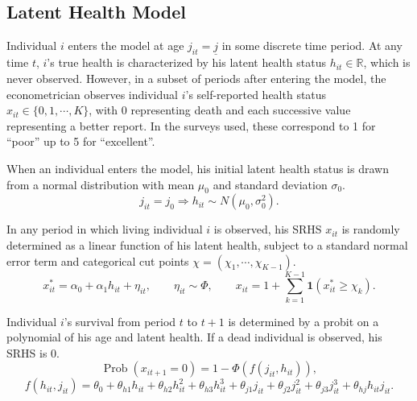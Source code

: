 \documentclass[12pt,pdftex,letterpaper]{article}
\newcommand{\Prob}{\operatorname{Prob}}
\newcommand{\R}{\mathbb{R}}
\newcommand{\Health}{h}
\newcommand{\Report}{x}
\newcommand{\Age}{j}
\newcommand{\AgeMin}{\underline{\Age}}
\newcommand{\HealthInitMean}{\mu_0}
\newcommand{\HealthInitStd}{\sigma_0}
\newcommand{\Cut}{\chi}
\newcommand{\MortParam}{\theta}
\newcommand{\LatentParam}{\alpha}
\newcommand{\ReportShock}{\eta}
\begin{document}
\subsection{Latent Health Model}\label{sec:Model}

Individual $i$ enters the model at age $\Age_{it}=\AgeMin$ in some discrete time period.  At any time $t$, $i$'s true health is characterized by his latent health status $\Health_{it} \in \R$, which is never observed.  However, in a subset of periods after entering the model, the econometrician observes individual $i$'s self-reported health status $\Report_{it} \in \{0,1,\cdots,K\}$, with $0$ representing death and each successive value representing a better report.  In the surveys used, these correspond to 1 for ``poor'' up to 5 for ``excellent''.

When an individual enters the model, his initial latent health status is drawn from a normal distribution with mean $\HealthInitMean$ and standard deviation $\HealthInitStd$.
\begin{equation}\label{HealthInit}
\Age_{it}=\Age_0 \Longrightarrow \Health_{it} \sim N(\HealthInitMean, \HealthInitStd^2).
\end{equation}

In any period in which living individual $i$ is observed, his SRHS $\Report_{it}$ is randomly determined as a linear function of his latent health, subject to a standard normal error term and categorical cut points $\Cut = (\Cut_1, \cdots, \Cut_{K-1})$.
\begin{equation}\label{Report}
\Report^*_{it} = \LatentParam_0 + \LatentParam_1 \Health_{it} + \ReportShock_{it}, \qquad \ReportShock_{it} \sim \Phi, \qquad \Report_{it} = 1 + \sum_{k = 1}^{K-1} \mathbf{1}(\Report^*_{it} \geq \Cut_k). 
\end{equation}

Individual $i$'s survival from period $t$ to $t+1$ is determined by a probit on a polynomial of his age and latent health.  If a dead individual is observed, his SRHS is $0$.
\begin{equation}\label{Mortality}
\Prob(\Report_{it+1} = 0) = 1 - \Phi(f(\Age_{it}, \Health_{it})),
\end{equation}
\begin{equation*}
f(\Health_{it}, \Age_{it}) = \MortParam_0 + \MortParam_{\Health1} \Health_{it} + \MortParam_{\Health2} \Health_{it}^2 + \MortParam_{\Health3} \Health_{it}^3 + \MortParam_{\Age1} \Age_{it} + \MortParam_{\Age2} \Age_{it}^2 + \MortParam_{\Age3} \Age_{it}^3 + \MortParam_{\Health \Age} \Health_{it} \Age_{it}.
\end{equation*}
\end{document}
